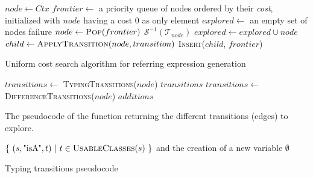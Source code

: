 \documentclass[a4paper,11pt,twoside]{StyleThese}
\begin{document}
\begin{algorithm}[H]
\begin{algorithmic}[1]
\State $node \leftarrow Ctx$
\State $frontier \leftarrow$ a priority queue of nodes ordered by their \textit{cost}, initialized with $node$ having a cost 0 as only element
\State $explored \leftarrow$ an empty set of nodes
\Loop
		\State \Return failure		
	\EndIf
	\State $node \leftarrow \textsc{Pop}(frontier)$
		\State \Return $\mathcal{S}^{-1}(\mathcal{T}_{node})$
	\EndIf
	\State $explored \leftarrow explored \cup node$
		\State $child \leftarrow \textsc{ApplyTransition}(node, transition)$
			\State \textsc{Insert}($child$, $frontier$)
		\EndIf
	\EndFor
\EndLoop
\EndFunction
\end{algorithmic}
 \caption{Uniform cost search algorithm for referring expression generation}
 \label{alg:reg}
\end{algorithm}

\begin{algorithm}[H]
\begin{algorithmic}[1]
\State $transitions\leftarrow$ \textsc{TypingTransitions}($node$)
	\State \Return $transitions$
\EndIf
\State $transitions\leftarrow$ \textsc{DifferenceTransitions}($node$)
\State \Return $additions$
\EndFunction
\end{algorithmic}
 \caption{The pseudocode of the function returning the different transitions (edges) to explore.}
\end{algorithm}

\begin{algorithm}[H]
\begin{algorithmic}[1]
\State \Return $\{\ (s,\text{"isA"},t)\ |\ t \in \textsc{UsableClasses}(s)\ \} $ and the creation of a new variable 
\EndIf
\EndFor
\State \Return $\emptyset$
\EndFunction
\end{algorithmic}
 \caption{Typing transitions pseudocode}
 \label{alg:typingtrans}
\end{algorithm}
\end{document}
